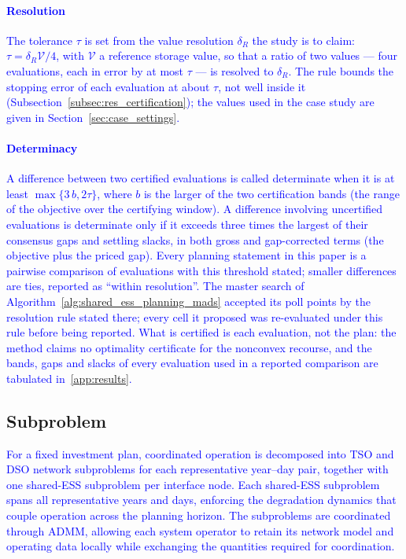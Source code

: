 \documentclass[preprint,12pt]{elsarticle}
\begin{document}
\textcolor{blue}{
    \paragraph{Resolution} The tolerance $\tau$ is set from the value resolution $\delta_R$ the study is to claim: $\tau = \delta_R \mathcal{V}/4$, with $\mathcal{V}$ a reference storage value, so that a ratio of two values --- four evaluations, each in error by at most $\tau$ --- is resolved to $\delta_R$. The rule bounds the stopping error of each evaluation at about $\tau$, not well inside it (Subsection~\ref{subsec:res_certification}); the values used in the case study are given in Section~\ref{sec:case_settings}.
}

\textcolor{blue}{
    \paragraph{Determinacy} A difference between two certified evaluations is called determinate when it is at least $\max\{3\,b, 2\tau\}$, where $b$ is the larger of the two certification bands (the range of the objective over the certifying window). A difference involving uncertified evaluations is determinate only if it exceeds three times the largest of their consensus gaps and settling slacks, in both gross and gap-corrected terms (the objective plus the priced gap). Every planning statement in this paper is a pairwise comparison of evaluations with this threshold stated; smaller differences are ties, reported as ``within resolution''. The master search of Algorithm~\ref{alg:shared_ess_planning_mads} accepted its poll points by the resolution rule stated there; every cell it proposed was re-evaluated under this rule before being reported. What is certified is each evaluation, not the plan: the method claims no optimality certificate for the nonconvex recourse, and the bands, gaps and slacks of every evaluation used in a reported comparison are tabulated in~\ref{app:results}.
}

\subsection{Subproblem}
\label{subsec:subproblem}

\textcolor{blue}{
    For a fixed investment plan, coordinated operation is decomposed into TSO and DSO network subproblems for each representative year--day pair, together with one shared-ESS subproblem per interface node. Each shared-ESS subproblem spans all representative years and days, enforcing the degradation dynamics that couple operation across the planning horizon. The subproblems are coordinated through ADMM, allowing each system operator to retain its network model and operating data locally while exchanging the quantities required for coordination.
}
\end{document}
